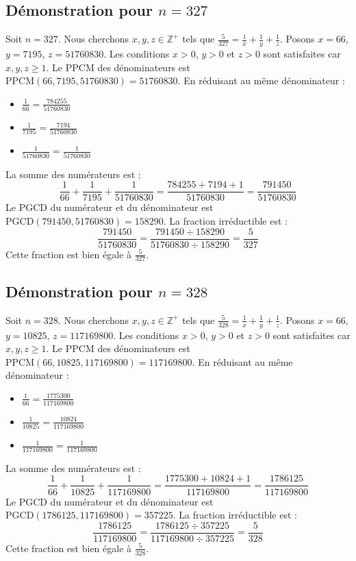 \documentclass[11pt,a4paper]{article}
\begin{document}
\subsection{Démonstration pour $n = 327$}
Soit $n = 327$. Nous cherchons $x, y, z \in \mathbb{Z}^{+}$ tels que $\frac{5}{327} = \frac{1}{x} + \frac{1}{y} + \frac{1}{z}$.
Posons $x = 66$, $y = 7195$, $z = 51760830$.
Les conditions $x > 0$, $y > 0$ et $z > 0$ sont satisfaites car $x, y, z \geq 1$.
Le PPCM des dénominateurs est $\text{PPCM}(66, 7195, 51760830) = 51760830$.
En réduisant au même dénominateur :
\begin{itemize}
    \item $\frac{1}{66} = \frac{784255}{51760830}$
    \item $\frac{1}{7195} = \frac{7194}{51760830}$
    \item $\frac{1}{51760830} = \frac{1}{51760830}$
\end{itemize}
La somme des numérateurs est :
$$ \frac{1}{66} + \frac{1}{7195} + \frac{1}{51760830} = \frac{784255 + 7194 + 1}{51760830} = \frac{791450}{51760830} $$
Le PGCD du numérateur et du dénominateur est $\text{PGCD}(791450, 51760830) = 158290$.
La fraction irréductible est :
$$ \frac{791450}{51760830} = \frac{791450 \div 158290}{51760830 \div 158290} = \frac{5}{327} $$
Cette fraction est bien égale à $\frac{5}{327}$.

\subsection{Démonstration pour $n = 328$}
Soit $n = 328$. Nous cherchons $x, y, z \in \mathbb{Z}^{+}$ tels que $\frac{5}{328} = \frac{1}{x} + \frac{1}{y} + \frac{1}{z}$.
Posons $x = 66$, $y = 10825$, $z = 117169800$.
Les conditions $x > 0$, $y > 0$ et $z > 0$ sont satisfaites car $x, y, z \geq 1$.
Le PPCM des dénominateurs est $\text{PPCM}(66, 10825, 117169800) = 117169800$.
En réduisant au même dénominateur :
\begin{itemize}
    \item $\frac{1}{66} = \frac{1775300}{117169800}$
    \item $\frac{1}{10825} = \frac{10824}{117169800}$
    \item $\frac{1}{117169800} = \frac{1}{117169800}$
\end{itemize}
La somme des numérateurs est :
$$ \frac{1}{66} + \frac{1}{10825} + \frac{1}{117169800} = \frac{1775300 + 10824 + 1}{117169800} = \frac{1786125}{117169800} $$
Le PGCD du numérateur et du dénominateur est $\text{PGCD}(1786125, 117169800) = 357225$.
La fraction irréductible est :
$$ \frac{1786125}{117169800} = \frac{1786125 \div 357225}{117169800 \div 357225} = \frac{5}{328} $$
Cette fraction est bien égale à $\frac{5}{328}$.
\end{document}

